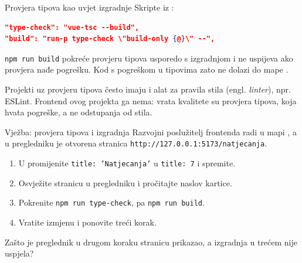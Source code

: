 \begin{frame}[fragile]{Provjera tipova kao uvjet izgradnje}
Skripte iz :

\begin{lstlisting}[language=json]
"type-check": "vue-tsc --build",
"build": "run-p type-check \"build-only {@}\" --",
\end{lstlisting}

\vspace{0.3em}
\texttt{npm run build} pokreće provjeru tipova usporedo s izgradnjom i ne uspijeva ako provjera nađe pogrešku. Kod s pogreškom u tipovima zato ne dolazi do mape .

\vspace{0.6em}
\begin{konvencija}
Projekti uz provjeru tipova često imaju i alat za pravila stila (engl. \emph{linter}), npr. ESLint. Frontend ovog projekta ga nema: vrata kvalitete su provjera tipova, koja hvata pogreške, a ne odstupanja od stila.
\end{konvencija}
\end{frame}

\begin{frame}{Vježba: provjera tipova i izgradnja}
Razvojni poslužitelj frontenda radi u mapi , a u pregledniku je otvorena stranica \texttt{http://127.0.0.1:5173/natjecanja}.

\vspace{0.8em}
\begin{enumerate}
  \itemsep0.4em
  \item U  promijenite \texttt{title: 'Natjecanja'} u \texttt{title: 7} i spremite.
  \item Osvježite stranicu u pregledniku i pročitajte naslov kartice.
  \item Pokrenite \texttt{npm run type-check}, pa \texttt{npm run build}.
  \item Vratite izmjenu i ponovite treći korak.
\end{enumerate}

\vspace{0.8em}
Zašto je preglednik u drugom koraku stranicu prikazao, a izgradnja u trećem nije uspjela?
\end{frame}


